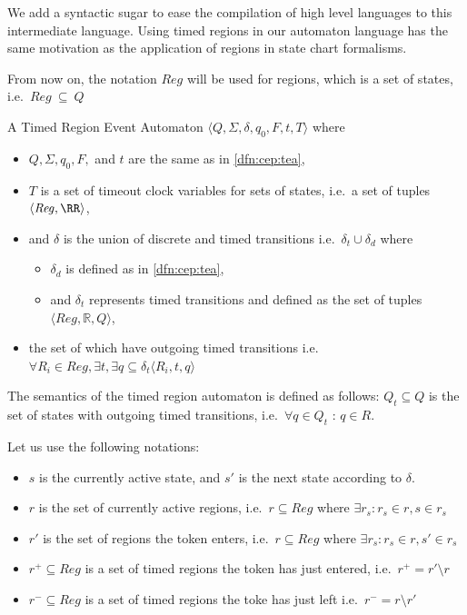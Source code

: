 		We add a syntactic sugar to ease the compilation of high level languages to this intermediate language.
		Using timed regions in our automaton language has the same motivation as the application of regions in state chart formalisms.
		
		From now on, the notation $\mathit{Reg}$ will be used for regions, which is a set of states, i.e.~$\mathit{Reg}~\subseteq~Q$
		
		
		\begin{dfn}
			\label{dfn:cep:trea}
			A Timed Region Event Automaton $\langle Q,\Sigma,\delta,q_0, F, t, T \rangle$ where
			\begin{itemize}
				\item $Q, \Sigma, q_0, F,$ and  $t$ are the same as in \cref{dfn:cep:tea},
				\item $T$ is a set of timeout clock variables for sets of states, i.e.~a set of tuples $\langle \mathit{Reg}, \RR \rangle$,
				\item and $\delta$ is the union of discrete and timed transitions i.e.~$\delta_t \cup \delta_d$ where
				\begin{itemize}
					\item $\delta_d$ is defined as in \cref{dfn:cep:tea},
					\item and $\delta_t$ represents timed transitions and defined as the set of tuples $\langle \mathit{Reg} , \mathbb{R} , Q \rangle$,
				\end{itemize}
				\item  the set of which have outgoing timed transitions i.e.~$ \forall R_i \in \mathit{Reg}, \exists t, \exists q  \subseteq \delta_t \langle R_i, t, q \rangle$ 
			\end{itemize}
		\end{dfn}
		
		The semantics of the timed region automaton is defined as follows:
		$Q_t \subseteq Q$ is the set of states with outgoing timed transitions, 
		i.e.~$\forall q \in Q_t$ : $ q \in R $. 
		
		
		Let us use the following notations: 
		
		\begin{itemize}
			\item $s$ is the currently active state, and $s'$ is the next state according to $\delta$.
			
			\item $r$ is the set of currently active regions, i.e.~$r \subseteq \mathit{Reg}$ where $\exists r_s : r_s \in r, s \in r_s $ 
			
			\item $r'$ is the set of regions the token enters, i.e.~$r \subseteq \mathit{Reg}$ where $\exists r_s :  r_s \in r, s' \in r_s $ 
			
			\item $r^+ \subseteq \mathit{Reg}$ is a set of timed regions the token has just entered, i.e.~$r^+ = r' \setminus r$ 
			
			\item $r^- \subseteq \mathit{Reg}$ is a set of timed regions the toke has just left i.e.~$r^- = r \setminus r'$
		\end{itemize}
		
